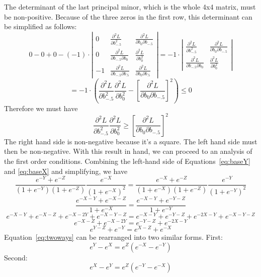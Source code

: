 \documentclass[12pt]{article}
\begin{document}
The determinant of the last principal minor, which is the whole 4x4 matrix, must be non-positive. Because of the three zeros in the first row, this determinant can be simplified as follows:
		\[
		  0 - 0 + 0 - (-1)\cdot 
			\left|\begin{array}{ccc}
				0 & \frac{\partial^2 L}{\partial b_{-.5}^2} & \frac{\partial^2 L}{\partial b_0\partial b_{-.5}}  \\
			0 & \frac{\partial^2 L}{\partial b_{-.5} \partial b_0} & \frac{\partial^2 L}{\partial b_0^2} \\
			-1 & \frac{\partial^2 L}{\partial b_{-.5}\partial b_{.5}} & \frac{\partial^2 L}{\partial b_0 \partial b_{.5}} 
			\end{array} \right| =	
			- 1 \cdot \left|\begin{array}{cc}
			\frac{\partial^2 L}{\partial b_{-.5}^2} & \frac{\partial^2 L}{\partial b_0\partial b_{-.5}}  \\
			\frac{\partial^2 L}{\partial b_{-.5} \partial b_0} & \frac{\partial^2 L}{\partial b_0^2}
			\end{array} \right|
		\]		
		\[
		  = - 1 \cdot \left(
			\frac{\partial^2 L}{\partial b_{-.5}^2} \frac{\partial^2 L}{\partial b_0^2} - \left[\frac{\partial^2 L}{\partial b_0\partial b_{-.5}}\right]^2 \right) \leq 0
		\]
	Therefore we must have 
		\begin{equation}
		  \frac{\partial^2 L}{\partial b_{-.5}^2} \frac{\partial^2 L}{\partial b_0^2} \geq \left[\frac{\partial^2 L}{\partial b_0\partial b_{-.5}}\right]^2 
			\label{eq:soc}
		\end{equation}
	  The right hand side is non-negative because it's a square. The left hand side must then be non-negative. With this result in hand, we can proceed to an analysis of the first order conditions. Combining the left-hand side of Equations~\ref{eq:baseY} and \ref{eq:baseX} and simplifying, we have
		\[
		  \frac{e^{-Y} + e^{-Z}}{\left(1+e^{-Y}\right)\left(1+e^{-Z}\right)} \frac{e^{-X}}{\left(1+e^{-X}\right)^2}= \frac{e^{-X} + e^{-Z}}{\left(1+e^{-X}\right)\left(1+e^{-Z}\right)} \frac{e^{-Y}}{\left(1+e^{-Y}\right)^2}
		\]
		\[
		  \frac{e^{-X-Y} + e^{-X-Z}}{1+e^{-X}}= \frac{e^{-X-Y} + e^{-Y-Z}}{1+e^{-Y}}
		\]
		\[
		  e^{-X-Y} + e^{-X-Z} + e^{-X-2Y} +e^{-X-Y-Z}= e^{-X-Y} + e^{-Y-Z} + e^{-2X-Y} +e^{-X-Y-Z}
		\]
		\[
		  e^{-X-Z} +e^{-X-2Y}= e^{-Y-Z} +e^{-2X-Y}
		\]
		\begin{equation}
		  e^{Y-Z} +e^{-Y}= e^{X-Z} +e^{-X}
			\label{eq:twoways}
		\end{equation}
   Equation~\ref{eq:twoways} can be rearranged into two similar forms. First:
		\begin{equation}
		  e^{Y} - e^{X}= e^Z\left(e^{-X} - e^{-Y}\right)
			\label{eq:1}
		\end{equation}
  	Second:
	  \begin{equation}
		  e^{X} - e^{Y}= e^Z\left(e^{-Y} - e^{-X}\right)
			\label{eq:2}
		\end{equation}
		
\end{document}
